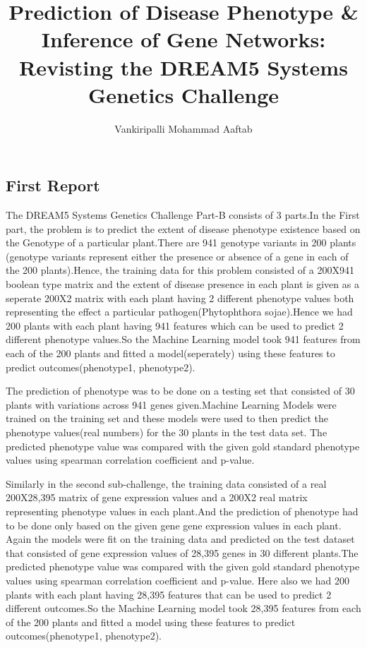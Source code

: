 \documentclass{ifacconf}
\begin{document}
\begin{frontmatter}

\title{Prediction of Disease Phenotype \& Inference of Gene Networks: Revisting the DREAM5 Systems Genetics Challenge}

\author[First]{Vankiripalli Mohammad Aaftab}
 
\address[First]{Department of Mechanical Engineering, IIT Madras (e-mail: aaftaabv@gmail.com)}



\end{frontmatter}


\subsection{First Report}

The DREAM5 Systems Genetics Challenge Part-B consists of 3 parts.In the First part, the problem is to predict the extent of disease phenotype existence based on the Genotype of a particular plant.There are 941 genotype variants in 200 plants (genotype variants represent either the presence or absence of a gene in each of the 200 plants).Hence, the training data for this problem consisted of a 200X941 boolean type matrix and the extent of disease presence in each plant is given as a seperate 200X2 matrix with each plant having 2 different phenotype values both representing the effect a particular pathogen(Phytophthora sojae).Hence we had 200 plants with each plant having 941 features which can be used to predict 2 different phenotype values.So the Machine Learning model took 941 features from each of the 200 plants and fitted a model(seperately) using these features to predict outcomes(phenotype1, phenotype2).

The prediction of phenotype was to be done on a testing set that consisted of 30 plants with variations across 941 genes given.Machine Learning Models were trained on the training set and these models were used to then predict the phenotype values(real numbers) for the 30 plants in the test data set.
The predicted phenotype value was compared with the given gold standard phenotype values using spearman correlation coefficient and p-value. 

Similarly in the second sub-challenge, the training data consisted of a real 200X28,395 matrix of gene expression values and a 200X2 real matrix representing phenotype values in each plant.And the prediction of phenotype had to be done only based on the given gene gene expression values in each plant. Again the models were fit on the training data and predicted on the test dataset that consisted of gene expression values of 28,395 genes in 30 different plants.The predicted phenotype value was compared with the given gold standard phenotype values using spearman correlation coefficient and p-value. 
Here also we had 200 plants with each plant having 28,395 features that can be used to predict 2 different outcomes.So the Machine Learning model took 28,395 features from each of the 200 plants and fitted a model using these features to predict outcomes(phenotype1, phenotype2).
\end{document}
